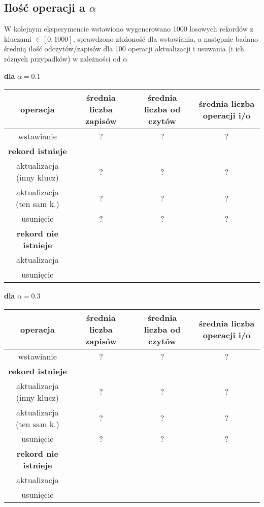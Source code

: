\documentclass{article}
\begin{document}
\subsection{Ilość operacji a $\alpha$}
W kolejnym eksperymencie wstawiono wygenerowano 1000 losowych rekordów z kluczami $\in [0, 1000]$, sprawdzono złożoność dla wstawiania, a następnie badano średnią ilość odczytów/zapisów dla 100 operacji aktualizacji i usuwania (i ich różnych przypadków)
w zależności od $\alpha$
\begin{center}
\textbf{dla} $\alpha = 0.1$ \\
\begin{tabular}{ c | c c | c}
 operacja & średnia liczba zapisów & średnia liczba od czytów & średnia liczba operacji i/o \\ 
\hline
 wstawianie & ? & ? & ? \\  
 \hline 
 \textbf{rekord istnieje}\\
 aktualizacja (inny klucz) & ? & ? & ? \\
 aktualizacja (ten sam k.) & ? & ? & ? \\
 usunięcie & ? & ? & ? \\
 \hline
 \textbf{rekord nie istnieje} \\
 aktualizacja \\
 usunięcie \\
\hline \hline
\end{tabular}
\end{center}
\begin{center}
\textbf{dla} $\alpha = 0.3$ \\
\begin{tabular}{ c | c c | c}
 operacja & średnia liczba zapisów & średnia liczba od czytów & średnia liczba operacji i/o \\ 
\hline
 wstawianie & ? & ? & ? \\  
 \hline 
 \textbf{rekord istnieje}\\
 aktualizacja (inny klucz) & ? & ? & ? \\
 aktualizacja (ten sam k.) & ? & ? & ? \\
 usunięcie & ? & ? & ? \\
 \hline
 \textbf{rekord nie istnieje} \\
 aktualizacja \\
 usunięcie  \\
\hline \hline
\end{tabular}
\end{center}
\end{document}

